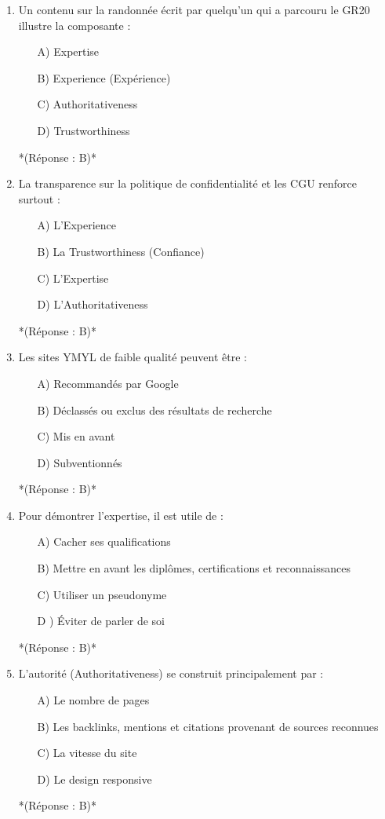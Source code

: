 \documentclass[12pt,a4paper,twoside]{report}
\begin{document}
\begin{enumerate}
\item Un contenu sur la randonnée écrit par quelqu'un qui a parcouru le GR20 illustre la composante :
\begin{itemize}
\item[A)] Expertise
\item[B)] Experience (Expérience)
\item[C)] Authoritativeness
\item[D)] Trustworthiness
\end{itemize}
*(Réponse : B)*

\item La transparence sur la politique de confidentialité et les CGU renforce surtout :
\begin{itemize}
\item[A)] L'Experience
\item[B)] La Trustworthiness (Confiance)
\item[C)] L'Expertise
\item[D)] L'Authoritativeness
\end{itemize}
*(Réponse : B)*

\item Les sites YMYL de faible qualité peuvent être :
\begin{itemize}
\item[A)] Recommandés par Google
\item[B)] Déclassés ou exclus des résultats de recherche
\item[C)] Mis en avant
\item[D)] Subventionnés
\end{itemize}
*(Réponse : B)*

\item Pour démontrer l'expertise, il est utile de :
\begin{itemize}
\item[A)] Cacher ses qualifications
\item[B)] Mettre en avant les diplômes, certifications et reconnaissances
\item[C)] Utiliser un pseudonyme
\item[D]) Éviter de parler de soi
\end{itemize}
*(Réponse : B)*

\item L'autorité (Authoritativeness) se construit principalement par :
\begin{itemize}
\item[A)] Le nombre de pages
\item[B)] Les backlinks, mentions et citations provenant de sources reconnues
\item[C)] La vitesse du site
\item[D)] Le design responsive
\end{itemize}
*(Réponse : B)*


\end{enumerate}
\end{document}
